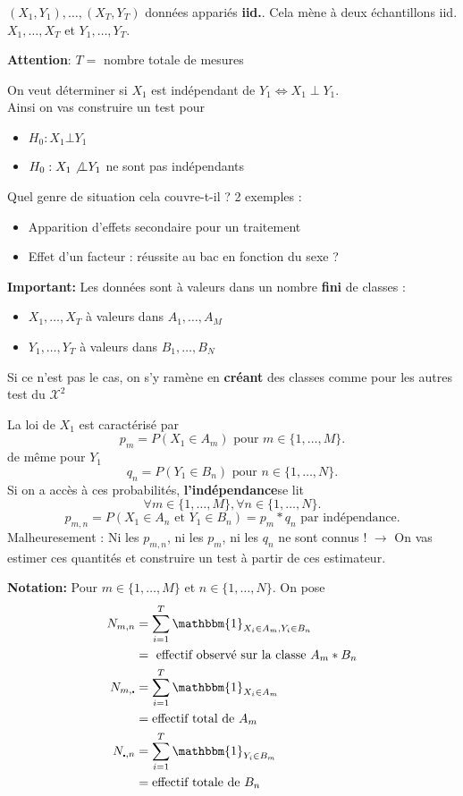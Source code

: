 \documentclass{article}
\theoremstyle{plain}%
\theoremstyle{definition}
\theoremstyle{remark}
\begin{document}
$ (X_1, Y_1), \dots, (X_T, Y_T)$ données appariés \textbf{iid.}.
Cela mène à deux échantillons iid. $ X_1, \dots, X_T  $ et $ Y_1, \dots, Y_T $. 

\textbf{Attention}: $ T = $ nombre totale de mesures

On veut déterminer si $ X_1 $ est indépendant de $ Y_1 \Leftrightarrow X_1 \perp Y_1$. \\
Ainsi on vas construire un test pour \begin{itemize}
    \item $ H_0 : X_1 \bot Y_1$ 
    \item $ H_0 : X_1 \not\bot Y_1$ ne sont pas indépendants
\end{itemize}
Quel genre de situation cela couvre-t-il ? 2 exemples : \begin{itemize}
    \item Apparition d'effets secondaire pour un traitement
    \item Effet d'un facteur : réussite au bac en fonction du sexe ? 
\end{itemize}

\textbf{Important:} Les données sont à valeurs dans un nombre \textbf{fini} de classes :\begin{itemize}
    \item $ X_1, \dots, X_T $ à valeurs dans $ A_1, \dots, A_M $ 
    \item $ Y_1, \dots, Y_T $ à valeurs dans $ B_1, \dots, B_N $ 
\end{itemize}
Si ce n'est pas le cas, on s'y ramène en \textbf{créant} des classes comme pour les autres test du $ \mathcal{X}^2 $ 

La loi de $ X_1 $ est caractérisé par 
\[
    p_m = P(X_1 \in A_m) \text{ pour }  m \in \{1, \dots, M\}
.\]
de même pour $ Y_1 $ 
\[
    q_n = P(Y_1 \in B_n) \text{ pour }  n \in \{1, \dots, N\}
.\]
Si on a accès à ces probabilités, \textbf{l'indépendance}se lit 
\[
    \forall m \in \{1, \dots, M\}, \forall n \in \{1, \dots, N\}
.\]
\[
    p_{m,n} = P(X_1 \in A_n \text{ et } Y_1 \in B_n) = p_m * q_n \text{ par indépendance}
.\]
Malheuresement : Ni les $ p_{m,n} $, ni les $ p_m $, ni les $ q_n $ ne sont connus ! $\rightarrow$ On vas estimer ces quantités et construire un test à partir de ces estimateur. 

\textbf{Notation:} Pour $ m \in \{1, \dots, M\} $ et $ n \in \{1, \dots, N\} $. On pose 
\begin{align*}
    N_{m,n} &= \sum_{i=1}^{T}\mathbbm{1}_{X_i \in A_m, Y_i \in B_n} \\
            &= \text{ effectif observé sur la classe } A_m * B_n \\
    N_{m, \centerdot} &= \sum_{i=1}^{T}\mathbbm{1}_{X_i \in A_m}\\
            &= \text{effectif total de } A_m \\
    N_{\centerdot, n} &= \sum_{i=1}^{T}\mathbbm{1}_{Y_i \in B_m} \\
        &= \text{effectif totale de } B_n
\end{align*}
\end{document}
